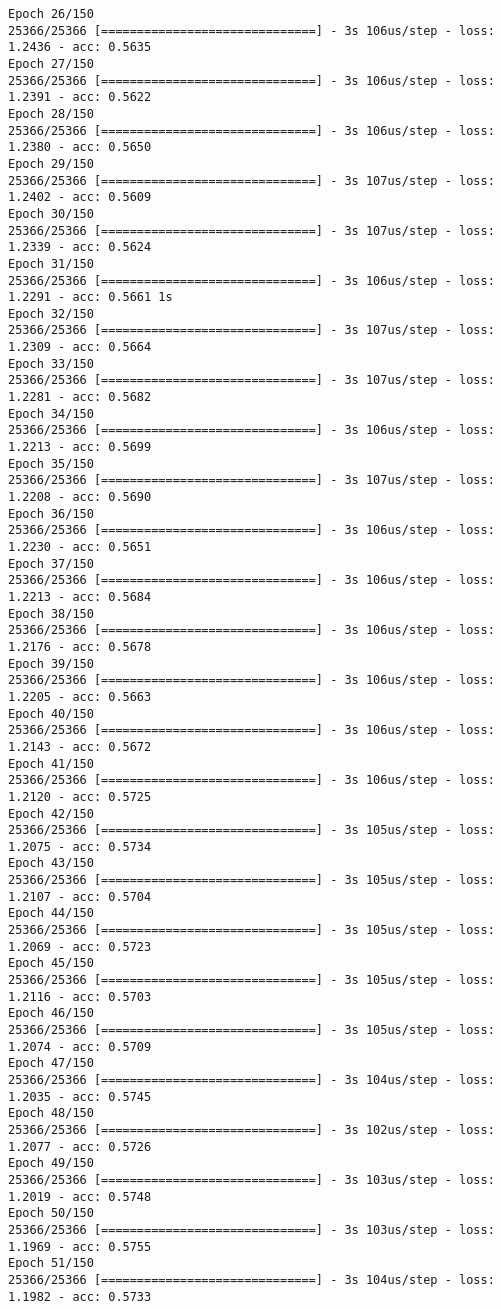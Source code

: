 \documentclass[11pt]{article}
\begin{document}
\begin{Verbatim}[commandchars=\\\{\}]
Epoch 26/150
25366/25366 [==============================] - 3s 106us/step - loss: 1.2436 - acc: 0.5635
Epoch 27/150
25366/25366 [==============================] - 3s 106us/step - loss: 1.2391 - acc: 0.5622
Epoch 28/150
25366/25366 [==============================] - 3s 106us/step - loss: 1.2380 - acc: 0.5650
Epoch 29/150
25366/25366 [==============================] - 3s 107us/step - loss: 1.2402 - acc: 0.5609
Epoch 30/150
25366/25366 [==============================] - 3s 107us/step - loss: 1.2339 - acc: 0.5624
Epoch 31/150
25366/25366 [==============================] - 3s 106us/step - loss: 1.2291 - acc: 0.5661 1s 
Epoch 32/150
25366/25366 [==============================] - 3s 107us/step - loss: 1.2309 - acc: 0.5664
Epoch 33/150
25366/25366 [==============================] - 3s 107us/step - loss: 1.2281 - acc: 0.5682
Epoch 34/150
25366/25366 [==============================] - 3s 106us/step - loss: 1.2213 - acc: 0.5699
Epoch 35/150
25366/25366 [==============================] - 3s 107us/step - loss: 1.2208 - acc: 0.5690
Epoch 36/150
25366/25366 [==============================] - 3s 106us/step - loss: 1.2230 - acc: 0.5651
Epoch 37/150
25366/25366 [==============================] - 3s 106us/step - loss: 1.2213 - acc: 0.5684
Epoch 38/150
25366/25366 [==============================] - 3s 106us/step - loss: 1.2176 - acc: 0.5678
Epoch 39/150
25366/25366 [==============================] - 3s 106us/step - loss: 1.2205 - acc: 0.5663
Epoch 40/150
25366/25366 [==============================] - 3s 106us/step - loss: 1.2143 - acc: 0.5672
Epoch 41/150
25366/25366 [==============================] - 3s 106us/step - loss: 1.2120 - acc: 0.5725
Epoch 42/150
25366/25366 [==============================] - 3s 105us/step - loss: 1.2075 - acc: 0.5734
Epoch 43/150
25366/25366 [==============================] - 3s 105us/step - loss: 1.2107 - acc: 0.5704
Epoch 44/150
25366/25366 [==============================] - 3s 105us/step - loss: 1.2069 - acc: 0.5723
Epoch 45/150
25366/25366 [==============================] - 3s 105us/step - loss: 1.2116 - acc: 0.5703
Epoch 46/150
25366/25366 [==============================] - 3s 105us/step - loss: 1.2074 - acc: 0.5709
Epoch 47/150
25366/25366 [==============================] - 3s 104us/step - loss: 1.2035 - acc: 0.5745
Epoch 48/150
25366/25366 [==============================] - 3s 102us/step - loss: 1.2077 - acc: 0.5726
Epoch 49/150
25366/25366 [==============================] - 3s 103us/step - loss: 1.2019 - acc: 0.5748
Epoch 50/150
25366/25366 [==============================] - 3s 103us/step - loss: 1.1969 - acc: 0.5755
Epoch 51/150
25366/25366 [==============================] - 3s 104us/step - loss: 1.1982 - acc: 0.5733

\end{Verbatim}
\end{document}
